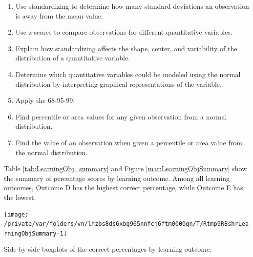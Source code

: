 \documentclass[12pt,english,nohyper]{tufte-handout}\usepackage[]{graphicx}\usepackage[]{color}
\newenvironment{knitrout}{}{} %
\begin{document}
\begin{fullwidth}
\begin{enumerate}[label=\Alph*.,itemsep=-\parsep,leftmargin=*]
  \item
Use standardizing to determine how many standard deviations an observation is away from the mean value.
\item Use z-scores to compare observations for different quantitative variables.
\item Explain how standardizing affects the shape, center, and variability of the distribution of a quantitative variable.
\item Determine which quantitative variables could be modeled using the normal distribution by interpreting graphical representations of the variable.
\item Apply the 68-95-99.
\item Find percentile or area values for any given observation from a normal distribution.
\item Find the value of an observation when given a percentile or area value from the normal distribution.

\end{enumerate}
\end{fullwidth}

\newpage{}

Table \ref{tab:LearningObj_summary} and Figure \ref{mar:LearningObjSummary} show the summary of percentage scores by learning outcome.
Among all learning outcomes, Outcome
D
has the highest correct percentage, while Outcome
E
has the lowest.



\begin{knitrout}
\color{fgcolor}\begin{marginfigure}
\texttt{[image: /private/var/folders/vn/lhzbs8ds6xbg965nnfcj6ftm0000gn/T/Rtmp9RBshrLearningObjSummary-1]} \caption[Side-by-side boxplots of the correct percentages by learning outcome]{Side-by-side boxplots of the correct percentages by learning outcome.}\label{mar:LearningObjSummary}
\end{marginfigure}


\end{knitrout}
\end{document}
